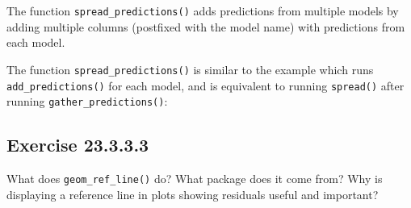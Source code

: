 \documentclass[]{book}
\newenvironment{Shaded}{\begin{snugshade}}{\end{snugshade}}
\newcommand{\CommentTok}[1]{\textcolor[rgb]{0.56,0.35,0.01}{\textit{#1}}}
\newcommand{\KeywordTok}[1]{\textcolor[rgb]{0.13,0.29,0.53}{\textbf{#1}}}
\newcommand{\NormalTok}[1]{#1}
\newcommand{\OperatorTok}[1]{\textcolor[rgb]{0.81,0.36,0.00}{\textbf{#1}}}
\newcommand{\StringTok}[1]{\textcolor[rgb]{0.31,0.60,0.02}{#1}}
\theoremstyle{plain}
\theoremstyle{remark}
\begin{document}
The function \texttt{spread\_predictions()} adds predictions from multiple models by
adding multiple columns (postfixed with the model name) with predictions from each model.

\begin{Shaded}
\end{Shaded}

The function \texttt{spread\_predictions()} is similar to the example which runs \texttt{add\_predictions()} for each model, and is equivalent to running \texttt{spread()} after
running \texttt{gather\_predictions()}:

\begin{Shaded}
\end{Shaded}

\hypertarget{exercise-23.3.3.3}{%
\subsection*{\texorpdfstring{Exercise {23.3.3.3}}{Exercise 23.3.3.3}}\label{exercise-23.3.3.3}}

What does \texttt{geom\_ref\_line()} do? What package does it come from?
Why is displaying a reference line in plots showing residuals useful and important?
\end{document}
